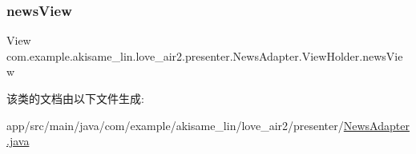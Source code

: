 \subsubsection{\texorpdfstring{newsView}{newsView}}
{\footnotesize\ttfamily View com.\+example.\+akisame\+\_\+lin.\+love\+\_\+air2.\+presenter.\+News\+Adapter.\+View\+Holder.\+news\+View\hspace{0.3cm}{\ttfamily [package]}}



该类的文档由以下文件生成\+:\begin{DoxyCompactItemize}
\item 
app/src/main/java/com/example/akisame\+\_\+lin/love\+\_\+air2/presenter/\mbox{\hyperlink{_news_adapter_8java}{News\+Adapter.\+java}}\end{DoxyCompactItemize}
